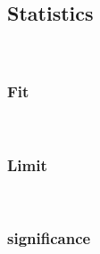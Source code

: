 \subsection{Statistics}
~\\
\subsubsection{Fit}
~\\
%
\begin{changemargin}{1.5cm}{1.5cm} 
  
\end{changemargin}
%

\subsubsection{Limit}
~\\
%
\begin{changemargin}{1.5cm}{1.5cm} 
  
\end{changemargin}
%

\subsubsection{significance}
~\\
%
\begin{changemargin}{1.5cm}{1.5cm} 
  
\end{changemargin}
%

